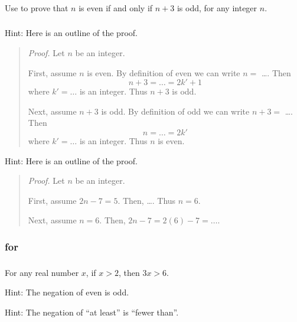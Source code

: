 \subsubsection*{ \answers}
    Use  to prove that $n$ is even if and only if $n+3$ is odd, for any integer $n$.

\subsubsection*{ \answers}

Hint: Here is an outline of the proof.
     \begin{quote}
        \emph{Proof.}  Let $n$ be an integer.  
        
        First, assume $n$ is even.  By definition of even we can write $n=$ \ldots.  Then $$n+3 = \ldots = 2k'+1$$
        where $k' = \ldots$ is an integer.  Thus $n+3$ is odd.

        Next, assume $n+3$ is odd.  By definition of odd we can write $n+3=$ \ldots.  Then $$n = \ldots = 2k'$$
        where $k' = \ldots$ is an integer.  Thus $n$ is even.    
     \end{quote}

Hint: Here is an outline of the proof.
     \begin{quote}
        \emph{Proof.}  Let $n$ be an integer.  
        
        First, assume $2n-7=5$.  Then, \ldots.  Thus $n=6$.

        Next, assume $n=6$.  Then, $2n-7 = 2(6)-7 = \ldots$.   
     \end{quote}

\subsubsection{\answers for  \subcp}

\subsubsection*{ \answers}
\begin{apart}
    \item For any real number $x$, if $x > 2$, then $3x > 6$.
    \item Hint: The negation of even is odd.
    \item Hint: The negation of ``at least'' is ``fewer than''.
\end{apart}

